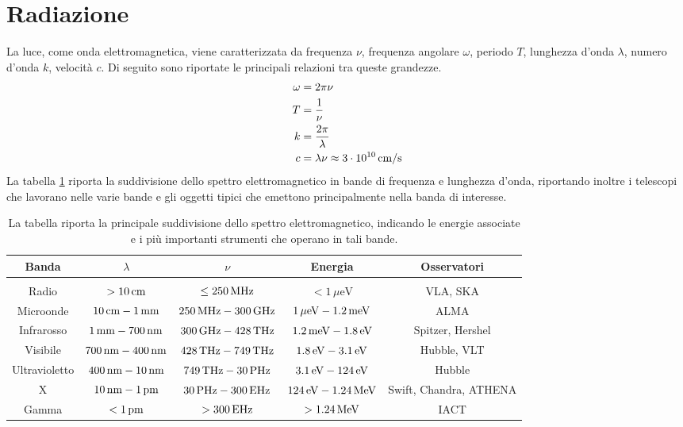 \section{Radiazione}
La luce, come onda elettromagnetica, viene caratterizzata da frequenza $\nu$, frequenza angolare $\omega$, periodo $T$, lunghezza d'onda $\lambda$, numero d'onda $k$, velocità $c$. Di seguito sono riportate le principali relazioni tra queste grandezze.
\begin{align*}
\omega &= 2\pi \nu \\
T &= \dfrac{1}{\nu} \\
k &= \dfrac{2\pi}{\lambda}\\
c &= \lambda\nu \approx 3\cdot 10^{10} \, \mathrm{cm}/\mathrm{s}
\end{align*}
La tabella \ref{tab:spettro} riporta la suddivisione dello spettro elettromagnetico in bande di frequenza e lunghezza d'onda, riportando inoltre i telescopi che lavorano nelle varie bande e gli oggetti tipici che emettono principalmente nella banda di interesse.
\begin{table}
\begin{center}
\begin{tabular}{ccccc}
\toprule
Banda &$\lambda$ & $\nu$ & Energia & Osservatori \\
\midrule \\[0.4ex]
Radio & $>10 \,\mathrm{c m}$ & $\leq 250 \,\mathrm{M Hz}$ &$<1\,\mu\mathrm{eV}$ & VLA, SKA \\[2pt]
Microonde & $10 \,\mathrm{c m} - 1 \,\mathrm{m m}$ & $ 250 \,\mathrm{M Hz} - 300 \,\mathrm{G Hz}$ &$1\,\mu\mathrm{eV} - 1.2 \,\mathrm{m eV}$ & ALMA\\[2pt]
Infrarosso & $1 \,\mathrm{m m} - 700 \,\mathrm{n m}$ & $ 300 \,\mathrm{G Hz} - 428 \,\mathrm{T Hz}$ &$ 1.2 \,\mathrm{m eV} - 1.8 \,\mathrm{ eV}$ & Spitzer, Hershel\\[2pt]
Visibile & $700 \,\mathrm{n m} - 400 \,\mathrm{n m}$ & $ 428 \,\mathrm{T Hz} - 749 \,\mathrm{T Hz}$ &$1.8 \,\mathrm{ eV} - 3.1 \,\mathrm{ eV}$ & Hubble, VLT\\[2pt]
Ultravioletto & $400 \,\mathrm{n m} - 10 \,\mathrm{n m}$ & $ 749 \,\mathrm{T Hz} - 30 \,\mathrm{P Hz}$ &$3.1 \,\mathrm{ eV} - 124 \,\mathrm{ eV}$ & Hubble\\[2pt]
X& $10 \,\mathrm{n m} - 1 \,\mathrm{p m}$ & $ 30 \,\mathrm{P Hz} - 300 \,\mathrm{E Hz}$ &$124 \,\mathrm{ eV} - 1.24 \,\mathrm{M eV}$ & Swift, Chandra, ATHENA\\[2pt]
Gamma& $< 1 \,\mathrm{p m}$ & $ > 300 \,\mathrm{E Hz}$ &$>1.24 \,\mathrm{M eV}$ & IACT\\[2pt]
\bottomrule
\end{tabular} 
\end{center}
\caption{La tabella riporta la principale suddivisione dello spettro elettromagnetico, indicando le energie associate e i più importanti strumenti che operano in tali bande.} \label{tab:spettro}
\end{table}




